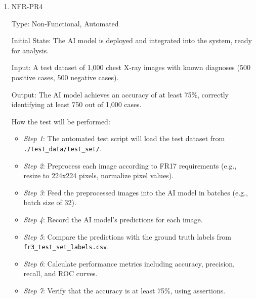 \documentclass[12pt, titlepage]{article}
\begin{document}
\begin{enumerate}
\begin{enumerate}
Input/Condition: Collections of 20 identical or varied images, multiple user accounts. Baseline for each image processing is 20 seconds.

Output/Result: Processing time (float), system resource utilization (float), images uploading success/fail (boolean).

How this test will be performed: The automated script will simulate different users to upload 20 images simultaneously and start the stopwatch or monitoring tool when the uploads begin. It will keep track of the CPU, memory, and I/O usage during the processing of the 20 images. When image processing is finished, it will calculate and return the average processing time for the 20 images, return CPU usage, memory usage, and check for errors or failures.

\item{NFR-PR4}\label{NFR-PR4}

Type: Non-Functional, Automated

Initial State: The AI model is deployed and integrated into the system, ready for analysis.

Input: A test dataset of 1,000 chest X-ray images with known diagnoses (500 positive cases, 500 negative cases).

Output: The AI model achieves an accuracy of at least 75\%, correctly identifying at least 750 out of 1,000 cases.

How the test will be performed:
\begin{itemize}
  \item[-] \textit{Step 1}: The automated test script will load the test dataset from \texttt{./test\_data/test\_set/}.
  \item[-] \textit{Step 2}: Preprocess each image according to FR17 requirements (e.g., resize to 224x224 pixels, normalize pixel values).
  \item[-] \textit{Step 3}: Feed the preprocessed images into the AI model in batches (e.g., batch size of 32).
  \item[-] \textit{Step 4}: Record the AI model's predictions for each image.
  \item[-] \textit{Step 5}: Compare the predictions with the ground truth labels from \texttt{fr3\_test\_set\_labels.csv}.
  \item[-] \textit{Step 6}: Calculate performance metrics including accuracy, precision, recall, and ROC curves.
  \item[-] \textit{Step 7}: Verify that the accuracy is at least 75\%, using assertions.
\end{itemize}


\end{enumerate}
\end{enumerate}
\end{document}

